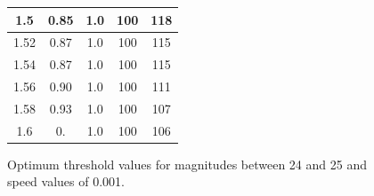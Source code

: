 \documentclass{article}
\begin{document}
\begin{figure}[H]
\begin{tabular}{|c|c|c|c|c|}
\hline
1.5 & 0.85 & 1.0 & 100 & 118\\
\hline
1.52 & 0.87 & 1.0 & 100 & 115\\
\hline
1.54 & 0.87 & 1.0 & 100 & 115\\
\hline
1.56 & 0.90 & 1.0 & 100 & 111\\
\hline
1.58 & 0.93 & 1.0 & 100 & 107\\
\hline
1.6 & 0. & 1.0 & 100 & 106\\
\hline
\end{tabular}
\captionsetup{labelformat=andtable}
\caption{Optimum threshold values for magnitudes between 24 and 25 and speed values of 0.001.}
\end{figure}
\end{document}
